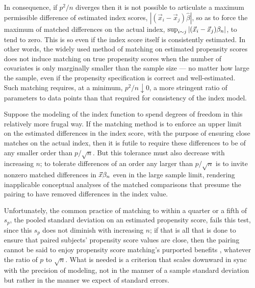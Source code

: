 \documentclass{article}
\theoremstyle{remark}
\begin{document}
In consequence, if $p^2/n$ diverges then it is not possible to
articulate a maximum permissible difference of estimated
index scores, $|(\vec{x}_i - \vec{x}_j)\hat\beta|$, so as to force
the maximum of matched differences on the actual index,
$\sup_{i \sim j}|(\vec{x}_i - \vec{x}_j)\beta_{n }|$, to tend to zero. This
is so even if the index score itself is consistently estimated.
In other words, the widely used method of matching on estimated
propensity scores does not induce matching on true propensity scores
when the number of covariates is only marginally smaller than the sample
size --- no matter how large the sample, even if the propensity
specification is correct and well-estimated. Such matching requires, at
a minimum, $p^2/n \downarrow 0$, a more stringent ratio of
parameters to data points than that required for consistency of the
index model.

Suppose the modeling of the index function to spend degrees of freedom in this
relatively more frugal way. If the matching method is to enforce an
upper limit on the estimated differences in the index score, with the purpose of ensuring
close matches on the actual index, then it is futile to require
these differences to be of any smaller order than $p/\sqrt{n}$.  But
this tolerance must also decrease with increasing $n$; to tolerate differences of an order any larger than
$p/\sqrt{n}$ is to invite nonzero matched differences in $\vec{x}\beta_{n }$ even
in the large sample limit, rendering inapplicable conceptual analyses
of the matched comparisons that presume the pairing to have removed
differences in the index value. 

Unfortunately, the common practice of matching to within
a quarter or a fifth of $s_{p}$, the pooled standard deviation on an
estimated propensity score, fails this test, since this $s_{p}$ does not diminish with increasing $n$;
if that is all that is done to ensure that paired subjects' propensity
score values are close, then the pairing cannot be said to enjoy
propensity score matching's purported benefits
\citep{rosenbaum:rubi:1983}, whatever the ratio of $p$ to $\sqrt{n}$.
What is needed is a criterion that scales downward in sync with the
precision of modeling, not in the manner of a sample standard
deviation but rather in the manner we expect of standard errors.
\end{document}
